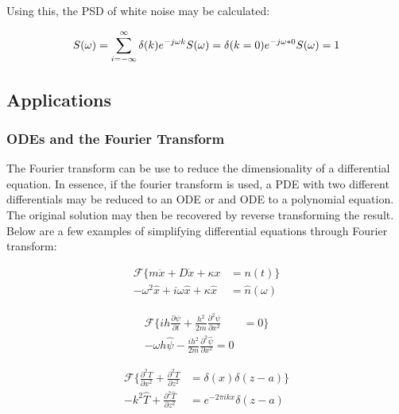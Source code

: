 \documentclass[twocolumn]{article}
\begin{document}
Using this, the PSD of white noise may be calculated:

\[ S(\omega) =  \sum_{i=-\infty}^{\infty} \delta (k) e^{-j\omega k}\\
S(\omega) = \delta(k=0) e^{-j\omega * 0} \\
S(\omega) = 1
  \] 


\subsection{Applications}
\subsubsection{ODEs and the Fourier Transform}
The Fourier transform can be use to reduce the dimensionality of a differential equation. In essence, if the fourier transform is used, a PDE with two different differentials may be reduced to an ODE or and ODE to a polynomial equation. The original solution may then be recovered by reverse transforming the result. Below are a few examples of simplifying differential equations through Fourier transform:

\begin{equation}
\begin{split}
\mathcal{F} \{ m\ddot{x} + D\dot{x} + \kappa x &= n(t) \} \\
-\omega^2 \hat{x} +i\omega \hat{x} + \kappa\hat{x} &= \hat{n}(\omega)
\end{split}
\end{equation}

\begin{equation}
\begin{split}
\mathcal{F} \{ih \frac{\partial \psi}{\partial t} + \frac{h^2}{2m} \frac{\partial^2 \psi}{\partial x^2} &= 0 \} \\
-\omega h \hat{\psi} - \frac{ih^2}{2m} \frac{\partial^2 \hat{\psi}}{\partial x^2} = 0
\end{split}
\end{equation}

\begin{equation}
\begin{split}
\mathcal{F} \{ \frac{\partial^2 T}{\partial x^2} + \frac{\partial^2 T}{\partial z^2} &= \delta (x) \delta (z - a) \}\\
-k^2 \hat{T} + \frac{\partial^2 \hat{T}}{\partial z^2} &= e^{-2\pi ik x} \delta (z - a)
\end{split}
\end{equation}
\end{document}
